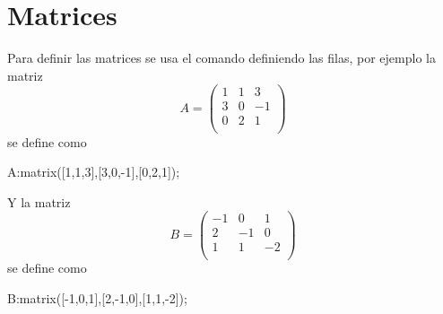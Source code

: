 
\section{Matrices}

Para definir las matrices se usa el comando 
definiendo las filas, por ejemplo la matriz
\begin{equation*}
 A = \begin{pmatrix}
  1 & 1 & 3 \\
  3 & 0 & -1 \\
  0 & 2 & 1 \\
 \end{pmatrix}
\end{equation*}
se define como
\begin{maximai}
 A:matrix([1,1,3],[3,0,-1],[0,2,1]);
\end{maximai}
Y la matriz 
\begin{equation*}
 B = \begin{pmatrix}
  -1 & 0 & 1 \\
  2 & -1 & 0 \\
  1 & 1 & -2 \\
 \end{pmatrix}
\end{equation*}
se define como
\begin{maximai}
 B:matrix([-1,0,1],[2,-1,0],[1,1,-2]);
\end{maximai}
